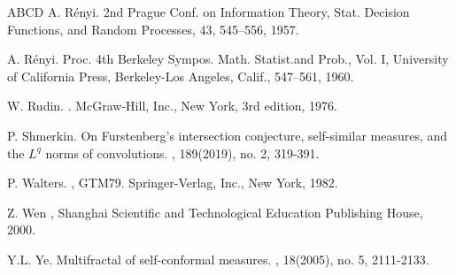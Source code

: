 \documentclass[12pt]{amsart}
\theoremstyle{plain}
\theoremstyle{definition}
\theoremstyle{remark}
\begin{document}
\begin{thebibliography}{ABCD}
 A. R\'{e}nyi.
		\newblock 2nd Prague Conf. on Information Theory, Stat. Decision Functions, and Random Processes, 43, 545–556, 1957.

 A. R\'{e}nyi.
		\newblock Proc. 4th Berkeley Sympos. Math. Statist.and Prob., Vol. I, University of California Press, Berkeley-Los Angeles, Calif., 547–561, 1960.

 W. Rudin.
		.
		\newblock McGraw-Hill, Inc., New York, 3rd edition, 1976.

P. Shmerkin.
		\newblock On Furstenberg's intersection conjecture, self-similar measures, and the $L^q$ norms of convolutions.
		, 189(2019), no. 2, 319-391.

 P. Walters.
		,
		\newblock GTM79. Springer-Verlag, Inc., New York, 1982.

		 Z. Wen
		,
		\newblock Shanghai Scientific and Technological Education Publishing House, 2000.

 Y.L. Ye.
		\newblock  Multifractal of self-conformal measures.
		, 18(2005), no. 5, 2111-2133.


		
	\end{thebibliography}
\end{document}
